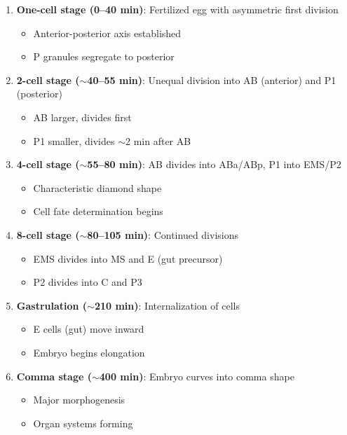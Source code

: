 \documentclass[11pt,letterpaper]{article}
\begin{document}
\begin{enumerate}
    \item \textbf{One-cell stage (0--40 min)}: Fertilized egg with asymmetric first division
    \begin{itemize}
        \item Anterior-posterior axis established
        \item P granules segregate to posterior
    \end{itemize}

    \item \textbf{2-cell stage ($\sim$40--55 min)}: Unequal division into AB (anterior) and P1 (posterior)
    \begin{itemize}
        \item AB larger, divides first
        \item P1 smaller, divides $\sim$2 min after AB
    \end{itemize}

    \item \textbf{4-cell stage ($\sim$55--80 min)}: AB divides into ABa/ABp, P1 into EMS/P2
    \begin{itemize}
        \item Characteristic diamond shape
        \item Cell fate determination begins
    \end{itemize}

    \item \textbf{8-cell stage ($\sim$80--105 min)}: Continued divisions
    \begin{itemize}
        \item EMS divides into MS and E (gut precursor)
        \item P2 divides into C and P3
    \end{itemize}

    \item \textbf{Gastrulation ($\sim$210 min)}: Internalization of cells
    \begin{itemize}
        \item E cells (gut) move inward
        \item Embryo begins elongation
    \end{itemize}

    \item \textbf{Comma stage ($\sim$400 min)}: Embryo curves into comma shape
    \begin{itemize}
        \item Major morphogenesis
        \item Organ systems forming
    \end{itemize}


\end{enumerate}
\end{document}
